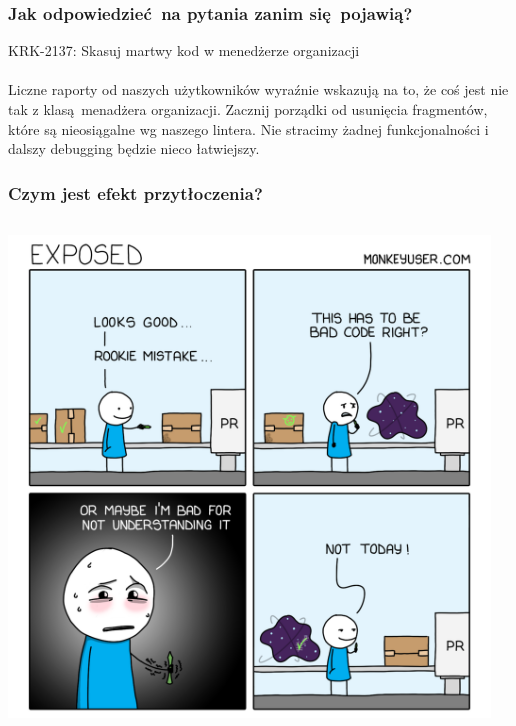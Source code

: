 \documentclass[xcolor=dvipsnames]{beamer}%
\begin{document}
\begin{frame}
	\frametitle{Jak odpowiedzieć na pytania zanim się pojawią?}
	KRK-2137: Skasuj martwy kod w menedżerze organizacji \\~\\
	Liczne raporty od naszych użytkowników wyraźnie wskazują na to,
	że coś jest nie tak z klasą menadżera organizacji. Zacznij
	porządki od usunięcia fragmentów, które są nieosiągalne wg
	naszego lintera. Nie stracimy żadnej funkcjonalności i dalszy
	debugging będzie nieco łatwiejszy.
\end{frame}

\begin{frame}
	\frametitle{Czym jest efekt przytłoczenia?}
	\begin{columns}
		\begin{column}{0.5\textwidth}
			\includegraphics[width=\textwidth,height=\textheight,keepaspectratio]{figure/exposed.png}
		\end{column}
		\begin{column}{0.5\textwidth}

\end{column}
\end{columns}
\end{frame}
\end{document}
